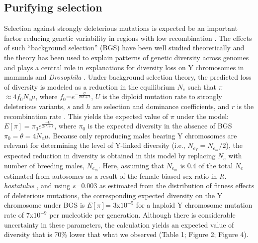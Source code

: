 \documentclass[9pt,twocolumn,twoside]{gsajnl}
\begin{document}
\subsection*{Purifying selection}
Selection against strongly deleterious mutations is expected be an important factor reducing genetic variability in regions with low recombination \citep{charlesworth1993effect, charlesworth1996background}. The effects of such “background selection” (BGS) have been well studied theoretically \citep{charlesworth1997effects, nordborg1996effect, kim2000joint} and the theory has been used to explain patterns of genetic diversity across genomes \citep{comeron2014background} and plays a central role in explanations for diversity loss on Y chromosomes in mammals \citep{Wilsonsayres2014} and \textit{Drosophila} \citep{mcallister1999, charlesworth1996CB}. Under background selection theory, the predicted loss of diversity is modeled as a reduction in the equilibrium $N_{e}$ such that $\pi$ $\approx 4f_{0}N_{e}\mu$, where $f_{0}$=$e^{-\frac{U}{2sh+r}}$, $U$ is the diploid mutation rate to strongly deleterious variants, $s$ and $h$ are selection and dominance coefficients, and $r$ is the recombination rate \citep{hudson1995deleterious}. This yields the expected value of $\pi$ under the model: $E[\pi]=\pi_{0}e^{\frac{-U}{2sh+r}}$, where $\pi_{0}$ is the expected diversity in the absence of BGS $\pi_{0}=\theta=4N_{e}\mu$. Because only reproducing males bearing Y chromosomes are relevant for determining the level of Y-linked diversity (i.e., $N_{e}_{Y} = N_{e}_{m}/2$), the expected reduction in diversity is obtained in this model by replacing $N_{e}$ with number of breeding males, $N_{e}_{m}$. Here, assuming that $N_{e}_{m}$ is 0.4 of the total $N_{e}$ estimated from autosomes as a result of the female biased sex ratio in \textit{R. hastatulus} \citep{pickup2013influence}, and using $s$=0.003 as estimated from the distribution of fitness effects of deleterious mutations, the corresponding expected diversity on the Y chromosome under BGS is $E[\pi]$= 3x$10^{-5}$ for a haploid Y chromosome mutation rate of 7x$10^{-9}$ per nucleotide per generation. Although there is considerable uncertainty in these parameters, the calculation yields an expected value of diversity that is 70\% lower that what we observed (Table 1; Figure 2; Figure 4).
\end{document}
